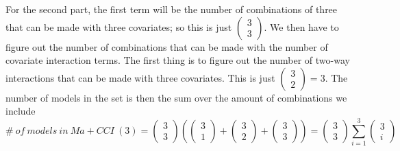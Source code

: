 For the second part, the first term will be the number of combinations of three that can be made with three covariates; so this is just $\left( \begin{array}{c}
3 \\ 
3 \end{array}
\right)$. We then have to figure out the number of combinations that can be made with the number of covariate interaction terms. The first thing is to figure out the number of two-way interactions that can be made with three covariates. This is just $\left( \begin{array}{c}
3 \\ 
2 \end{array}
\right)=3$. The number of models in the set is then the sum over the amount of combinations we include
\[\#\ of\ models\ in\ Ma+CCI\ \left(3\right)=\left( \begin{array}{c}
3 \\ 
3 \end{array}
\right)\left(\left( \begin{array}{c}
3 \\ 
1 \end{array}
\right)+\left( \begin{array}{c}
3 \\ 
2 \end{array}
\right)+\left( \begin{array}{c}
3 \\ 
3 \end{array}
\right)\right)=\left( \begin{array}{c}
3 \\ 
3 \end{array}
\right)\sum^3_{i=1}{\left( \begin{array}{c}
3 \\ 
i \end{array}
\right)}\] 


